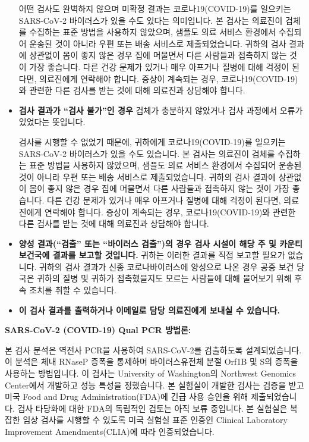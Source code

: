 \documentclass[10pt]{article}
\begin{document}
\begin{itemize}
  어떤 검사도 완벽하지 않으며 미확정 결과는 코로나19(COVID-19)를 일으키는 SARS-CoV-2
  바이러스가 있을 수도 있다는 의미입니다.  본 검사는 의료진이 검체를 수집하는 표준 방법을 사용하지
  않았으며, 샘플도 의료 서비스 환경에서 수집되어 운송된 것이 아니라 우편 또는 배송 서비스로
  제출되었습니다.  귀하의 검사 결과에 상관없이 몸이 좋지 않은 경우 집에 머물면서 다른 사람들과
  접촉하지 않는 것이 가장 좋습니다. 다른 건강 문제가 있거나 매우 아프거나 질병에 대해 걱정이
  된다면, 의료진에게 연락해야 합니다.  증상이 계속되는 경우, 코로나19(COVID-19)와 관련한 다른
  검사를 받는 것에 대해 의료진과 상담해야 합니다.

\item

  \textbf{검사 결과가 ``검사 불가''인 경우} 검체가 충분하지 않았거나 검사 과정에서 오류가
  있었다는 뜻입니다.

  검사를 시행할 수 없었기 때문에, 귀하에게 코로나19(COVID-19)를 일으키는 SARS-CoV-2 바이러스가
  있을 수도 있습니다.  본 검사는 의료진이 검체를 수집하는 표준 방법을 사용하지 않았으며, 샘플도
  의료 서비스 환경에서 수집되어 운송된 것이 아니라 우편 또는 배송 서비스로 제출되었습니다.  귀하의
  검사 결과에 상관없이 몸이 좋지 않은 경우 집에 머물면서 다른 사람들과 접촉하지 않는 것이 가장
  좋습니다. 다른 건강 문제가 있거나 매우 아프거나 질병에 대해 걱정이 된다면, 의료진에게 연락해야
  합니다.  증상이 계속되는 경우, 코로나19(COVID-19)와 관련한 다른 검사를 받는 것에 대해 의료진과
  상담해야 합니다.

\item

  \textbf{양성 결과(``검출'' 또는 ``바이러스 검출'')의 경우 검사 시설이 해당 주 및 카운티
  보건국에 결과를 보고할 것입니다.} 귀하는 이러한 결과를 직접 보고할 필요가 없습니다.  귀하의 검사
  결과가 신종 코로나바이러스에 양성으로 나온 경우 공중 보건 당국은 귀하의 질병 및 귀하가
  접촉했을지도 모르는 사람들에 대해 물어보기 위해 후속 조치를 취할 수 있습니다.

\item

  \textbf{이 검사 결과를 출력하거나 이메일로 담당 의료진에게 보내실 수 있습니다.}

\end{itemize}

\bigskip
\textbf{SARS-CoV-2 (COVID-19) Qual PCR 방법론:}

본 검사 분석은 역전사 PCR을 사용하여 SARS-CoV-2를 검출하도록 설계되었습니다. 이 분석은 체내
RNaseP 증폭을 통제하며 바이러스유전체 분절 Orf1B 및 S의 증폭을 사용하는 방법입니다.  이 검사는
University of Washington의 Northwest Genomics Center에서 개발하고 성능 특성을
정했습니다.  본 실험실이 개발한 검사는 검증을 받고 미국 Food and Drug Administration(FDA)에
긴급 사용 승인을 위해 제출되었습니다. 검사 타당화에 대한 FDA의 독립적인 검토는 아직 보류 중입니다.
본 실험실은 복잡한 임상 검사를 시행할 수 있도록 미국 실험실 표준 인증인 Clinical Laboratory
Improvement Amendments(CLIA)에 따라 인증되었습니다.
\end{document}
